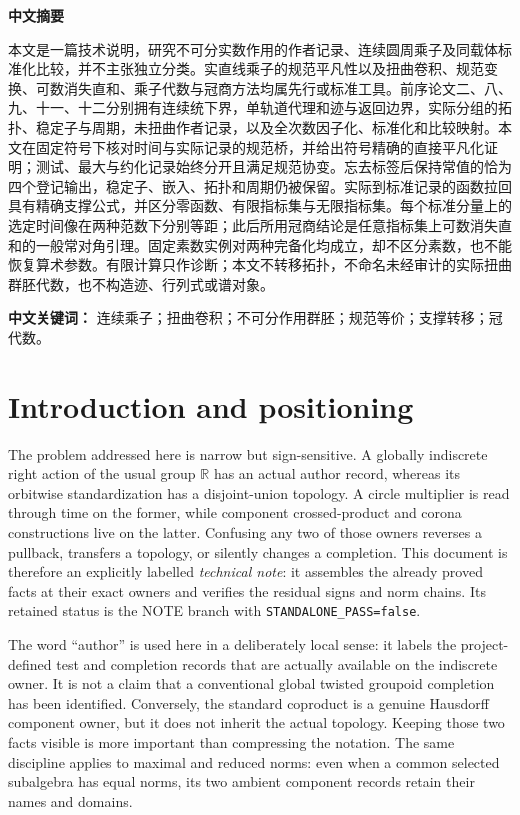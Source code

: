 \documentclass[11pt]{article}
\theoremstyle{definition}
\newcommand{\R}{\mathbb R}
\begin{document}
\begin{center}
\textbf{中文摘要}
\end{center}
\begingroup\small
\noindent
本文是一篇技术说明，研究不可分实数作用的作者记录、连续圆周乘子及同载体标准化比较，并不主张独立分类。实直线乘子的规范平凡性以及扭曲卷积、规范变换、可数消失直和、乘子代数与冠商方法均属先行或标准工具。前序论文二、八、九、十一、十二分别拥有连续统下界，单轨道代理和迹与返回边界，实际分组的拓扑、稳定子与周期，未扭曲作者记录，以及全次数因子化、标准化和比较映射。本文在固定符号下核对时间与实际记录的规范桥，并给出符号精确的直接平凡化证明；测试、最大与约化记录始终分开且满足规范协变。忘去标签后保持常值的恰为四个登记输出，稳定子、嵌入、拓扑和周期仍被保留。实际到标准记录的函数拉回具有精确支撑公式，并区分零函数、有限指标集与无限指标集。每个标准分量上的选定时间像在两种范数下分别等距；此后所用冠商结论是任意指标集上可数消失直和的一般常对角引理。固定素数实例对两种完备化均成立，却不区分素数，也不能恢复算术参数。有限计算只作诊断；本文不转移拓扑，不命名未经审计的实际扭曲群胚代数，也不构造迹、行列式或谱对象。

\medskip
\noindent\textbf{中文关键词：} 连续乘子；扭曲卷积；不可分作用群胚；规范等价；支撑转移；冠代数。
\endgroup

\section{Introduction and positioning}\label{sec:introduction}

The problem addressed here is narrow but sign-sensitive.  A globally
indiscrete right action of the usual group $\R$ has an actual author record,
whereas its orbitwise standardization has a disjoint-union topology.  A
circle multiplier is read through time on the former, while component
crossed-product and corona constructions live on the latter.  Confusing any
two of those owners reverses a pullback, transfers a topology, or silently
changes a completion.  This document is therefore an explicitly labelled
\emph{technical note}: it assembles the already proved facts at their exact
owners and verifies the residual signs and norm chains.  Its retained status
is the NOTE branch with \texttt{STANDALONE\_PASS=false}.

The word ``author'' is used here in a deliberately local sense: it labels
the project-defined test and completion records that are actually available
on the indiscrete owner.  It is not a claim that a conventional global
twisted groupoid completion has been identified.  Conversely, the standard
coproduct is a genuine Hausdorff component owner, but it does not inherit the
actual topology.  Keeping those two facts visible is more important than
compressing the notation.  The same discipline applies to maximal and
reduced norms: even when a common selected subalgebra has equal norms, its
two ambient component records retain their names and domains.
\end{document}
